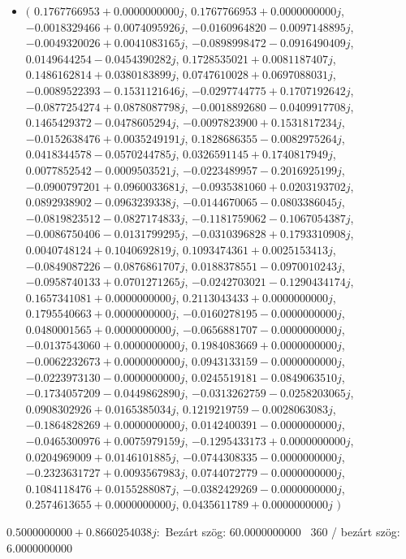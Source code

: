 \documentclass[14pt,a4paper]{article}
\begin{document}
\begin{itemize}
\item
$\big($
$0.1767766953+0.0000000000j$, $0.1767766953+0.0000000000j$, $-0.0018329466+0.0074095926j$, $-0.0160964820-0.0097148895j$, $-0.0049320026+0.0041083165j$, $-0.0898998472-0.0916490409j$, $0.0149644254-0.0454390282j$, $0.1728535021+0.0081187407j$, $0.1486162814+0.0380183899j$, $0.0747610028+0.0697088031j$, $-0.0089522393-0.1531121646j$, $-0.0297744775+0.1707192642j$, $-0.0877254274+0.0878087798j$, $-0.0018892680-0.0409917708j$, $0.1465429372-0.0478605294j$, $-0.0097823900+0.1531817234j$, $-0.0152638476+0.0035249191j$, $0.1828686355-0.0082975264j$, $0.0418344578-0.0570244785j$, $0.0326591145+0.1740817949j$, $0.0077852542-0.0009503521j$, $-0.0223489957-0.2016925199j$, $-0.0900797201+0.0960033681j$, $-0.0935381060+0.0203193702j$, $0.0892938902-0.0963239338j$, $-0.0144670065-0.0803386045j$, $-0.0819823512-0.0827174833j$, $-0.1181759062-0.1067054387j$, $-0.0086750406-0.0131799295j$, $-0.0310396828+0.1793310908j$, $0.0040748124+0.1040692819j$, $0.1093474361+0.0025153413j$, $-0.0849087226-0.0876861707j$, $0.0188378551-0.0970010243j$, $-0.0958740133+0.0701271265j$, $-0.0242703021-0.1290434174j$, $0.1657341081+0.0000000000j$, $0.2113043433+0.0000000000j$, $0.1795540663+0.0000000000j$, $-0.0160278195-0.0000000000j$, $0.0480001565+0.0000000000j$, $-0.0656881707-0.0000000000j$, $-0.0137543060+0.0000000000j$, $0.1984083669+0.0000000000j$, $-0.0062232673+0.0000000000j$, $0.0943133159-0.0000000000j$, $-0.0223973130-0.0000000000j$, $0.0245519181-0.0849063510j$, $-0.1734057209-0.0449862890j$, $-0.0313262759-0.0258203065j$, $0.0908302926+0.0165385034j$, $0.1219219759-0.0028063083j$, $-0.1864828269+0.0000000000j$, $0.0142400391-0.0000000000j$, $-0.0465300976+0.0075979159j$, $-0.1295433173+0.0000000000j$, $0.0204969009+0.0146101885j$, $-0.0744308335-0.0000000000j$, $-0.2323631727+0.0093567983j$, $0.0744072779-0.0000000000j$, $0.1084118476+0.0155288087j$, $-0.0382429269-0.0000000000j$, $0.2574613655+0.0000000000j$, $0.0435611789+0.0000000000j$
$\big)$
\end{itemize}
$0.5000000000+0.8660254038j$:\
Bezárt szög: $60.0000000000$ \
360 / bezárt szög: $6.0000000000$\
\end{document}
